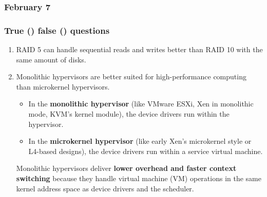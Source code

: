 \subsubsection{February 7}

\subsubsection*{True (\trueIcon) false (\falseIcon) questions}

\begin{enumerate}
    \item \trueIcon \: RAID 5 can handle sequential reads and writes better than RAID 10 with the same amount of disks.
    \item \trueIcon \: Monolithic hypervisors are better suited for high-performance computing than microkernel hypervisors.
    \begin{deepeningbox}
        \begin{itemize}
            \item In the \textbf{monolithic hypervisor} (like VMware ESXi, Xen in monolithic mode, KVM's kernel module), the device drivers run within the hypervisor.
            \item In the \textbf{microkernel hypervisor} (like early Xen's microkernel style or L4-based designs), the device drivers run within a service virtual machine.
        \end{itemize}
        Monolithic hypervisors deliver \textbf{lower overhead and faster context switching} because they handle virtual machine (VM) operations in the same kernel address space as device drivers and the scheduler.
        

\end{deepeningbox}
\end{enumerate}
